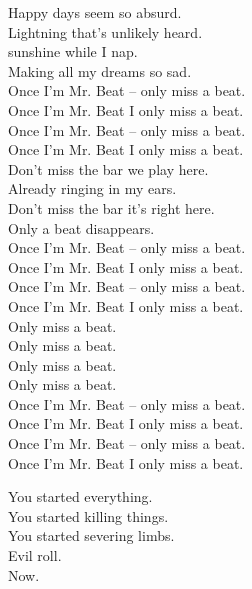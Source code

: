 Happy days seem so absurd. \\
Lightning that's unlikely heard. \\
 sunshine while I nap. \\
Making all my dreams so sad. \\

Once I'm Mr. Beat -- only miss a beat. \\
Once I'm Mr. Beat I only miss a beat. \\
Once I'm Mr. Beat -- only miss a beat. \\
Once I'm Mr. Beat I only miss a beat. \\

Don't miss the bar we play here. \\
Already ringing in my ears. \\
Don't miss the bar it's right here. \\
Only a beat disappears. \\

Once I'm Mr. Beat -- only miss a beat. \\
Once I'm Mr. Beat I only miss a beat. \\
Once I'm Mr. Beat -- only miss a beat. \\
Once I'm Mr. Beat I only miss a beat. \\

Only miss a beat. \\
Only miss a beat. \\
Only miss a beat. \\
Only miss a beat. \\

Once I'm Mr. Beat -- only miss a beat. \\
Once I'm Mr. Beat I only miss a beat. \\
Once I'm Mr. Beat -- only miss a beat. \\
Once I'm Mr. Beat I only miss a beat. \\




You started everything. \\
You started killing things. \\
You started severing limbs. \\

Evil  roll. \\
Now. \\

